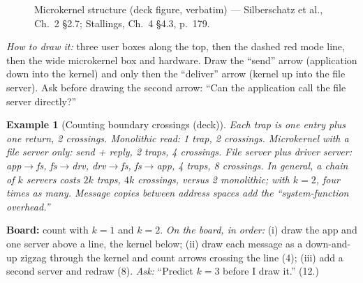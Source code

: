 \documentclass[11pt]{article}
\newtheorem{example}{Example}[section]
\begin{document}
\begin{figure}[h]
\centering
{}
\caption{Microkernel structure (deck figure, verbatim) --- Silberschatz et al., Ch.~2 \S2.7; Stallings, Ch.~4 \S4.3, p.~179.}
\label{fig:micro}
\end{figure}

\emph{How to draw it:} three user boxes along the top, then the dashed red mode line, then the wide microkernel box and hardware. Draw the ``send'' arrow (application down into the kernel) and only then the ``deliver'' arrow (kernel up into the file server). Ask before drawing the second arrow: ``Can the application call the file server directly?''

\begin{example}[Counting boundary crossings (deck)]
Each trap is one entry plus one return, 2 crossings. Monolithic read: 1 trap, 2 crossings. Microkernel with a file server only: send + reply, 2 traps, 4 crossings. File server plus driver server: app$\to$fs, fs$\to$drv, drv$\to$fs, fs$\to$app, 4 traps, 8 crossings. In general, a chain of $k$ servers costs $2k$ traps, $4k$ crossings, versus 2 monolithic; with $k=2$, four times as many. Message copies between address spaces add the ``system-function overhead.''
\end{example}

\textbf{Board:} count with $k=1$ and $k=2$. \emph{On the board, in order:} (i) draw the app and one server above a line, the kernel below; (ii) draw each message as a down-and-up zigzag through the kernel and count arrows crossing the line (4); (iii) add a second server and redraw (8). \emph{Ask:} ``Predict $k=3$ before I draw it.'' (12.)
\end{document}
